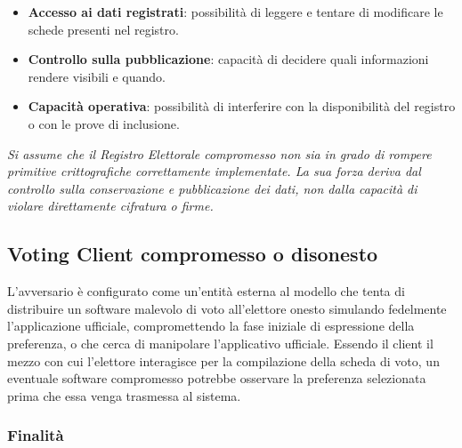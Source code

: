 \documentclass[a4paper,12pt]{article}
\begin{document}
\begin{itemize}
    \item \textbf{Accesso ai dati registrati}: possibilità di leggere e tentare di modificare le schede presenti nel registro.
    \item \textbf{Controllo sulla pubblicazione}: capacità di decidere quali informazioni rendere visibili e quando.
    \item \textbf{Capacità operativa}: possibilità di interferire con la disponibilità del registro o con le prove di inclusione.
\end{itemize}

\textit{Si assume che il Registro Elettorale compromesso non sia in grado di rompere primitive crittografiche correttamente implementate. La sua forza deriva dal controllo sulla conservazione e pubblicazione dei dati, non dalla capacità di violare direttamente cifratura o firme.}
\subsection{Voting Client compromesso o disonesto}

L'avversario è configurato come un'entità esterna al modello che tenta di distribuire un software malevolo di voto all'elettore onesto simulando fedelmente l'applicazione ufficiale, compromettendo la fase iniziale di espressione della preferenza, o che cerca di manipolare l'applicativo ufficiale. Essendo il client il mezzo con cui l'elettore interagisce per la compilazione della scheda di voto, un eventuale software compromesso potrebbe osservare la preferenza selezionata prima che essa venga trasmessa al sistema.

\subsubsection*{Finalità}
\end{document}
